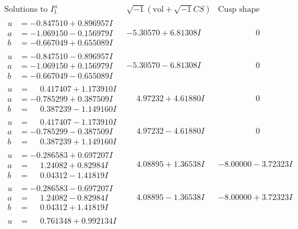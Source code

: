 \documentclass[1p]{elsarticle_modified}
\theoremstyle{definition}
\newcommand{\I}{\sqrt{-1}}
\begin{document}
$$\begin{array}{c|c|c}
\text{Solutions to }I^u_{1}& \I (\text{vol} + \sqrt{-1}CS) & \text{Cusp shape}\\
 \hline 
\begin{aligned}
u &= -0.847510 + 0.896957 I \\
a &= -1.069150 - 0.156979 I \\
b &= -0.667049 + 0.655089 I\end{aligned}
 & -5.30570 + 6.81308 I & \phantom{-0.000000 } 0 \\ \hline\begin{aligned}
u &= -0.847510 - 0.896957 I \\
a &= -1.069150 + 0.156979 I \\
b &= -0.667049 - 0.655089 I\end{aligned}
 & -5.30570 - 6.81308 I & \phantom{-0.000000 } 0 \\ \hline\begin{aligned}
u &= \phantom{-}0.417407 + 1.173910 I \\
a &= -0.785299 + 0.387509 I \\
b &= \phantom{-}0.387239 - 1.149160 I\end{aligned}
 & \phantom{-}4.97232 + 4.61880 I & \phantom{-0.000000 } 0 \\ \hline\begin{aligned}
u &= \phantom{-}0.417407 - 1.173910 I \\
a &= -0.785299 - 0.387509 I \\
b &= \phantom{-}0.387239 + 1.149160 I\end{aligned}
 & \phantom{-}4.97232 - 4.61880 I & \phantom{-0.000000 } 0 \\ \hline\begin{aligned}
u &= -0.286583 + 0.697207 I \\
a &= \phantom{-}1.24082 + 0.82984 I \\
b &= \phantom{-}0.04312 - 1.41819 I\end{aligned}
 & \phantom{-}4.08895 + 1.36538 I & -8.00000 - 3.72323 I \\ \hline\begin{aligned}
u &= -0.286583 - 0.697207 I \\
a &= \phantom{-}1.24082 - 0.82984 I \\
b &= \phantom{-}0.04312 + 1.41819 I\end{aligned}
 & \phantom{-}4.08895 - 1.36538 I & -8.00000 + 3.72323 I \\ \hline\begin{aligned}
u &= \phantom{-}0.761348 + 0.992134 I \\

\end{aligned}
\end{array}$$
\end{document}

